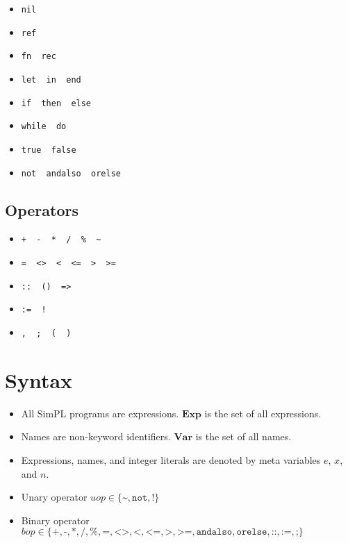 \documentclass{article}
\begin{document}
\begin{itemize}
  \item \texttt{nil}
  \item \texttt{ref}
  \item \texttt{fn \ rec}
  \item \texttt{let \ in \ end}
  \item \texttt{if \ then \ else}
  \item \texttt{while \ do}
  \item \texttt{true \ false}
  \item \texttt{not \ andalso \ orelse}
\end{itemize}

\subsection{Operators}

\begin{itemize}
  \item \texttt{+ \ - \ * \ / \ \% \ \~}
  \item \texttt{= \ <> \ < \ <= \ > \ >=}
  \item \texttt{:: \ () \ =>}
  \item \texttt{:= \ !}
  \item \texttt{, \ ; \ ( \ )}
\end{itemize}

\section{Syntax}

\begin{itemize}
  \item All SimPL programs are expressions.  $\mathbf{Exp}$ is the set of all expressions.
  \item Names are non-keyword identifiers.  $\mathbf{Var}$ is the set of all names.
  \item Expressions, names, and integer literals are denoted by meta variables $e$, $x$, and $n$.
  \item Unary operator $uop \in \{ \texttt{\textasciitilde}, \texttt{not}, \texttt{!} \}$
  \item Binary operator $bop \in \{ \texttt{+}, \texttt{-}, \texttt{*}, \texttt{/}, \texttt{\%}, \texttt{=}, \texttt{<>}, \texttt{<}, \texttt{<=}, \texttt{>}, \texttt{>=}, \texttt{andalso}, \texttt{orelse}, \texttt{::}, \texttt{:=}, \texttt{;} \}$
\end{itemize}
\end{document}
